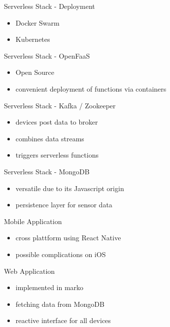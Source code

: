 \documentclass[aspectratio=1610]{beamer}
\begin{document}
  \begin{frame}{Serverless Stack - Deployment}
    \begin{itemize}
      \item Docker Swarm
      \item Kubernetes
    \end{itemize}
  \end{frame}

  \begin{frame}{Serverless Stack - OpenFaaS}
    \begin{itemize}
      \item Open Source
      \item convenient deployment of functions via containers
    \end{itemize}
  \end{frame}

  \begin{frame}{Serverless Stack - Kafka / Zookeeper}
    \begin{itemize}
      \item devices post data to broker
      \item combines data streams
      \item triggers serverless functions
    \end{itemize}
  \end{frame}

  \begin{frame}{Serverless Stack - MongoDB}
    \begin{itemize}
      \item versatile due to its Javascript origin
      \item persistence layer for sensor data
    \end{itemize}
  \end{frame}

  \begin{frame}{Mobile Application}
    \begin{itemize}
      \item cross plattform using React Native
      \item possible complications on iOS
    \end{itemize}
  \end{frame}

  \begin{frame}{Web Application}
    \begin{itemize}
      \item implemented in marko
      \item fetching data from MongoDB
      \item reactive interface for all devices
    \end{itemize}
  \end{frame}
\end{document}
